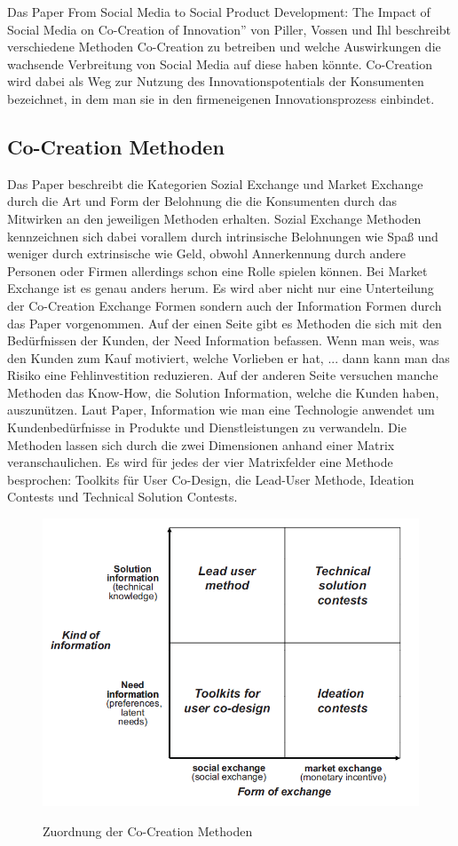 Das Paper \glqq From Social Media to Social Product Development: The Impact of Social Media on Co-Creation of Innovation'' von Piller, Vossen und Ihl beschreibt verschiedene Methoden Co-Creation zu betreiben und welche Auswirkungen die wachsende Verbreitung von Social Media auf diese haben k\"onnte. Co-Creation wird dabei als Weg zur Nutzung des Innovationspotentials der Konsumenten bezeichnet, in dem man sie in den firmeneigenen Innovationsprozess einbindet.
\subsection{Co-Creation Methoden}
Das Paper beschreibt die Kategorien Sozial Exchange und Market Exchange durch die Art und Form der Belohnung die die Konsumenten durch das Mitwirken an den jeweiligen Methoden erhalten. Sozial Exchange Methoden kennzeichnen sich dabei vorallem durch intrinsische Belohnungen wie Spa\ss{} und weniger durch extrinsische wie Geld, obwohl Annerkennung durch andere Personen oder Firmen allerdings  schon eine Rolle spielen k\"onnen. Bei Market Exchange ist es genau anders herum. Es wird aber nicht nur eine Unterteilung der Co-Creation Exchange Formen sondern auch der  Information Formen durch das Paper vorgenommen.
Auf der einen Seite gibt es Methoden die sich mit den Bed\"urfnissen der Kunden, der Need Information befassen. Wenn man weis, was den Kunden zum Kauf motiviert, welche Vorlieben er hat, ... dann kann man das Risiko eine Fehlinvestition reduzieren. Auf der anderen Seite versuchen manche Methoden das Know-How, die Solution Information, welche die Kunden haben, auszun\"utzen. Laut Paper, Information \glqq wie man eine Technologie anwendet um Kundenbed\"urfnisse in Produkte und Dienstleistungen zu verwandeln\grqq. Die Methoden lassen sich durch die zwei Dimensionen anhand einer Matrix veranschaulichen. Es wird f\"ur jedes der vier Matrixfelder eine Methode besprochen: Toolkits f\"ur User Co-Design, die Lead-User Methode, Ideation Contests und Technical Solution Contests.
\pagebreak
\begin{figure}[h!]
	\caption{Zuordnung der Co-Creation Methoden\cite{COCREATION}}
	\centering
		\includegraphics[scale=0.8]{figures/Co-Creation_Matrix}
	\label{quirkyInfluence}
\end{figure}
